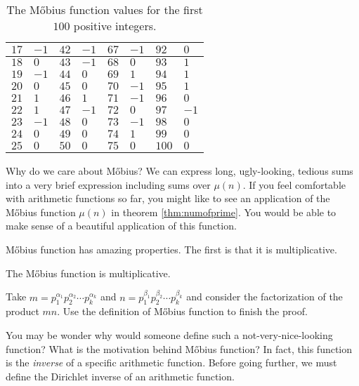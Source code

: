 \documentclass[12pt]{subfile}
\begin{document}
\begin{example}
\begin{table}
\begin{tabular}{ | l | l | l | l | l | l | l | l | }
					$17$ & $-1$  & $42$ & $-1$ & $67$ & $-1$ & $92$  & $0$     \\ \hline
					$18$ & $0$   & $43$ & $-1$ & $68$ & $0$  & $93$  & $1$     \\ \hline
					$19$ & $-1$  & $44$ & $0$  & $69$ & $1$  & $94$  & $1$     \\ \hline
					$20$ & $0$   & $45$ & $0$  & $70$ & $-1$ & $95$  & $1$     \\ \hline
					$21$ & $1$   & $46$ & $1$  & $71$ & $-1$ & $96$  & $0$     \\ \hline
					$22$ & $1$   & $47$ & $-1$ & $72$ & $0$  & $97$  & $-1$    \\ \hline
					$23$ & $-1$  & $48$ & $0$  & $73$ & $-1$ & $98$  & $0$     \\ \hline
					$24$ & $0$   & $49$ & $0$  & $74$ & $1$  & $99$  & $0$     \\ \hline
					$25$ & $0$   & $50$ & $0$  & $75$ & $0$  & $100$ & $0$      \\ \hline
				\end{tabular}
				\caption{The M\H obius function values for the first $100$ positive integers.}
				\label{table:mu(n)}
			\end{table}
		\end{example}
	
	\begin{note}
		Why do we care about M\H obius? We can express long, ugly-looking, tedious sums into a very brief expression including sums over $\mu(n)$. If you feel comfortable with arithmetic functions so far, you might like to see an application of the M\H obius function $\mu(n)$ in theorem \eqref{thm:numofprime}. You would be able to make sense of a beautiful application of this function.
	\end{note}
		M\H obius function has amazing properties. The first is that it is multiplicative. 
		\begin{proposition}
			The M\H obius function is multiplicative.
		\end{proposition}
		
		\begin{hint}
			Take $m=p_1^{\alpha_1}p_2^{\alpha_2} \cdots p_k^{\alpha_k}$ and $n=p_1^{\beta_1}p_2^{\beta_2} \cdots p_k^{\beta_k}$ and consider the factorization of the product $mn$. Use the definition of M\H obius function to finish the proof.
		\end{hint}

	You may be wonder why would someone define such a not-very-nice-looking function? What is the motivation behind M\H obius function? In fact, this function is the \textit{inverse} of a specific arithmetic function. Before going further, we must define the Dirichlet inverse of an arithmetic function. 
	
\end{document}
